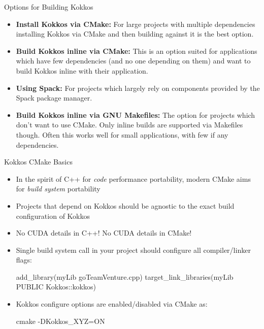 \begin{frame}[fragile]{Options for Building Kokkos}

\begin{itemize}
\item \textbf{Install Kokkos via CMake:} For large projects with multiple dependencies installing Kokkos via CMake and then building against it is the best option.
\item \textbf{Build Kokkos inline via CMake:} This is an option suited for applications which have few dependencies (and no one depending on them) and want to build Kokkos inline with their application.
\item \textbf{Using Spack:} For projects which largely rely on components provided by the Spack package manager.
\item \textbf{Build Kokkos inline via GNU Makefiles:} The option for projects which don't want to use CMake. Only inline builds are supported via Makefiles though. Often this works well for small applications, with few if any dependencies. 
\end{itemize}
\end{frame}

\begin{frame}[fragile]{Kokkos CMake Basics}
\begin{itemize}
\item In the spirit of C++ for \emph{code} performance portability, modern CMake aims for \emph{build system} portability
\item Projects that depend on Kokkos should be agnostic to the exact build configuration of Kokkos
\item No CUDA details in C++! No CUDA details in CMake!
\item Single build system call in your project should configure all compiler/linker flags:

\begin{shell}
add_library(myLib goTeamVenture.cpp)
target_link_libraries(myLib PUBLIC Kokkos::kokkos)
\end{shell}
\item Kokkos configure options are enabled/disabled via CMake as:
\begin{shell}
  cmake -DKokkos_XYZ=ON
\end{shell}
\end{itemize}
\end{frame}

